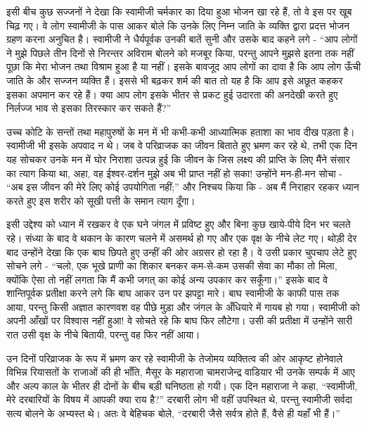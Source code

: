 इसी बीच कुछ सज्जनों ने देखा कि स्वामीजी चर्मकार का दिया हुआ भोजन खा रहे हैं, तो वे इस पर खूब चिढ़ गए। वे लोग स्वामीजी के पास आकर बोले कि उनके लिए निम्न जाति के व्यक्ति द्वारा प्रदत्त भोजन ग्रहण करना अनुचित है। स्वामीजी ने धैर्यपूर्वक उनकी बातें सुनी और उसके बाद कहने लगे - “आप लोगों ने मुझे पिछले तीन दिनों से निरन्तर अविराम बोलने को मजबूर किया, परन्तु आपने मुझसे इतना तक नहीं पूछा कि मेरा भोजन तथा विश्राम हुआ है या नहीं। इसके बावजूद आप लोगों का दावा है कि आप लोग ऊँची जाति के और सज्जन व्यक्ति हैं। इससे भी बढ़कर शर्म की बात तो यह है कि आप इसे अछूत कहकर इसका अपमान कर रहे हैं। क्या आप लोग इसके भीतर से प्रकट हुई उदारता की अनदेखी करते हुए निर्लज्ज भाव से इसका तिरस्कार कर सकते हैं?” 

\delimiter

उच्च कोटि के सन्तों तथा महापुरुषों के मन में भी कभी-कभी आध्यात्मिक हताशा का भाव दीख पड़ता है। स्वामीजी भी इसके अपवाद न थे। जब वे परिव्राजक का जीवन बिताते हुए भ्रमण कर रहे थे, तभी एक दिन यह सोचकर उनके मन में घोर निराशा उत्पन्न हुई कि जीवन के जिस लक्ष्य की प्राप्ति के लिए मैंने संसार का त्याग किया था, अहा, वह ईश्वर-दर्शन मुझे अब भी प्राप्त नहीं हो सका! उन्होंने मन-ही-मन सोचा - “अब इस जीवन की मेरे लिए कोई उपयोगिता नहीं;” और निश्चय किया कि - अब मैं निराहार रहकर ध्यान करते हुए इस शरीर को सूखी पत्ती के समान त्याग दूँगा। 

इसी उद्देश्य को ध्यान में रखकर वे एक घने जंगल में प्रविष्ट हुए और बिना कुछ खाये-पीये दिन भर चलते रहे। संध्या के बाद वे थकान के कारण चलने में असमर्थ हो गए और एक वृक्ष के नीचे लेट गए। थोड़ी देर बाद उन्होंने देखा कि एक बाघ छिपते हुए उन्हीं की ओर अग्रसर हो रहा है। वे उसी प्रकार चुपचाप लेटे हुए सोचने लगे - “चलो, एक भूखे प्राणी का शिकार बनकर कम-से-कम उसकी सेवा का मौका तो मिला, क्योंकि ऐसा तो नहीं लगता कि मैं कभी जगत् का कोई अन्य उपकार कर सकूँगा।” इसके बाद वे शान्तिपूर्वक प्रतीक्षा करने लगे कि बाघ आकर उन पर झपट्टा मारे। बाघ स्वामीजी के काफी पास तक आया, परन्तु किसी अज्ञात कारणवश वह पीछे मुड़ा और जंगल के अँधियारे में गायब हो गया। स्वामीजी को अपनी आँखों पर विश्वास नहीं हुआ! वे सोचते रहे कि बाघ फिर लौटेगा। उसी की प्रतीक्षा में उन्होंने सारी रात उसी वृक्ष के नीचे बितायी, परन्तु वह फिर नहीं आया। 

\delimiter

उन दिनों परिव्राजक के रूप में भ्रमण कर रहे स्वामीजी के तेजोमय व्यक्तित्व की ओर आकृष्ट होनेवाले विभिन्न रियासतों के राजाओं की ही भाँति, मैसूर के महाराजा चामराजेन्द्र वाडियार भी उनके सम्पर्क में आए और अल्प काल के भीतर ही दोनों के बीच बड़ी घनिष्ठता हो गयी। एक दिन महाराजा ने कहा, “स्वामीजी, मेरे दरबारियों के विषय में आपकी क्या राय है?” दरबारी लोग भी वहीं उपस्थित थे, परन्तु स्वामीजी सर्वदा सत्य बोलने के अभ्यस्त थे। अतः वे बेहिचक बोले, “दरबारी जैसे सर्वत्र होते हैं, वैसे ही यहाँ भी हैं।” 

